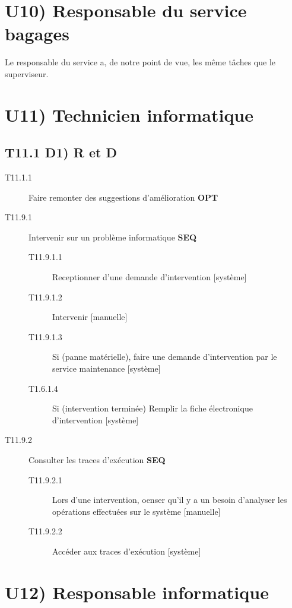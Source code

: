 	
\section*{U10) Responsable du service bagages}

Le responsable du service a, de notre point de vue, les même tâches que le
superviseur.

\section*{U11) Technicien informatique}
	\subsection*{T11.1 D1) R et D}
	\begin{description}
		\item[T11.1.1] Faire remonter des suggestions d'amélioration \textbf{OPT}
	\end{description}
	
	
	\begin{description}
		\item[T11.9.1] Intervenir sur un problème informatique \textbf{SEQ}
		\begin{description}
			\item[T11.9.1.1] Receptionner d'une demande d'intervention [système]
			\item[T11.9.1.2] Intervenir [manuelle]
			\item[T11.9.1.3] Si (panne matérielle), faire une demande d'intervention par
			le service maintenance [système]
			\item[T1.6.1.4] Si (intervention terminée) Remplir la fiche électronique d'intervention [système]
		\end{description}
		\item[T11.9.2] Consulter les traces d'exécution \textbf{SEQ}
		\begin{description}
			\item[T11.9.2.1] Lors d'une intervention, oenser qu'il y a un besoin d'analyser les opérations effectuées sur le système [manuelle]
			\item[T11.9.2.2] Accéder aux traces d'exécution [système]
		\end{description}
	\end{description} 
	
\section*{U12) Responsable informatique}
